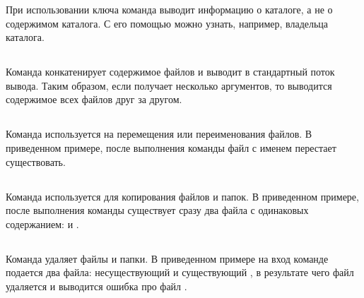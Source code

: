 При использовании ключа  команда выводит информацию о каталоге, а не о содержимом каталога. С его помощью можно узнать, например, владельца каталога.


\subsection{}

Команда  конкатенирует содержимое файлов и выводит в стандартный поток вывода. Таким образом, если  получает несколько аргументов, то выводится содержимое всех файлов друг за другом. 


\vspace{-1em}
\subsection{}

Команда  используется на перемещения или переименования файлов. В приведенном примере, после выполнения команды  файл с именем  перестает существовать.


\vspace{-1em}
\subsection{}

Команда  используется для копирования файлов и папок. В приведенном примере, после выполнения команды  существует сразу два файла с одинаковых содержанием:  и .


\vspace{-1em}
\subsection{}

Команда  удаляет файлы и папки. В приведенном примере на вход команде  подается два файла: несуществующий  и существующий , в результате чего файл  удаляется и выводится ошибка про файл .


\vspace{-1em}
\subsection{}

